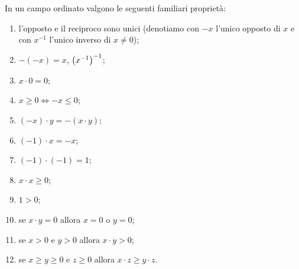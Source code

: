\begin{theorem}
\label{th:campo_ordinato}%
In un campo ordinato
valgono le seguenti
familiari proprietà:
\begin{enumerate}
  \item l'opposto e il reciproco sono unici
  (denotiamo con $-x$ l'unico opposto di $x$ e con $x^{-1}$ l'unico inverso di $x\neq 0$);
  \item $-(-x) = x$, ${\left( x^{-1} \right)}^{-1}$;
  \item $x \cdot 0 = 0$;
  \item $x\ge 0 \iff -x \le 0$;
  \item $(-x)\cdot y = -(x\cdot y)$;
  \item $(-1)\cdot x = -x$;
  \item $(-1)\cdot(-1) = 1$;
  \item $x\cdot x \ge 0$;
  \item $1 > 0$;
  \item se $x\cdot y = 0$ allora $x = 0$ o $y = 0$;
  \item se $x>0$ e $y>0$  allora $x\cdot y > 0$;
  \item se $x\ge y\ge 0$ e $z\ge 0$ allora $x\cdot z \ge y \cdot z$.
\end{enumerate}
\end{theorem}
%
